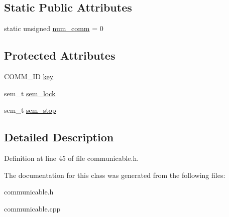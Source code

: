 \subsection*{Static Public Attributes}
\begin{CompactItemize}
\item 
\hypertarget{classCommunicable_7a6acfdc781a67c9c0ec4f17893f86c3}{
static unsigned \hyperlink{classCommunicable_7a6acfdc781a67c9c0ec4f17893f86c3}{num\_\-comm} = 0}
\label{classCommunicable_7a6acfdc781a67c9c0ec4f17893f86c3}

\end{CompactItemize}
\subsection*{Protected Attributes}
\begin{CompactItemize}
\item 
\hypertarget{classCommunicable_605b0efeffe81326f216c9903f5bbf4c}{
COMM\_\-ID \hyperlink{classCommunicable_605b0efeffe81326f216c9903f5bbf4c}{key}}
\label{classCommunicable_605b0efeffe81326f216c9903f5bbf4c}

\item 
\hypertarget{classCommunicable_cf9639312f71a2f348bc1e7789ccbd9d}{
sem\_\-t \hyperlink{classCommunicable_cf9639312f71a2f348bc1e7789ccbd9d}{sem\_\-lock}}
\label{classCommunicable_cf9639312f71a2f348bc1e7789ccbd9d}

\item 
\hypertarget{classCommunicable_29c53b9191348e0505e3bcba6d8b82b1}{
sem\_\-t \hyperlink{classCommunicable_29c53b9191348e0505e3bcba6d8b82b1}{sem\_\-stop}}
\label{classCommunicable_29c53b9191348e0505e3bcba6d8b82b1}

\end{CompactItemize}


\subsection{Detailed Description}




Definition at line 45 of file communicable.h.

The documentation for this class was generated from the following files:\begin{CompactItemize}
\item 
communicable.h\item 
communicable.cpp\end{CompactItemize}
